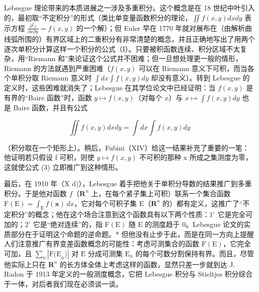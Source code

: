 Lebesgue 理论带来的本质进展之一涉及多重积分。这个概念是在 18 世纪中叶引入的，最初取“不定积分”的形式（类比单变量函数积分的理论，\(\iint f(x,y) dx dy\) 表示方程 \(\frac{\partial^2 z}{\partial x \partial y} = f(x,y)\) 的一个解）；但 Euler 早在 1770 年就对展布在（由解析曲线弧所围的）有界区域上的二重积分有非常清楚的概念，并且正确地写出了用两个逐次单积分计算这样一个积分的公式（I）。只要被积函数连续、积分区域不太复杂，用“Riemann 和”来论证这个公式并不困难；但一旦想处理更一般的情形，Riemann 的方法就遇到严重困难（\(f(x,y)\) 可以在 Riemann 意义下可积，而当各个单积分取 Riemann 意义时 \(\int dx \int f(x,y) dy\) 却没有意义）。转到 Lebesgue 的定义时，这些困难就消失了；Lebesgue 在其学位论文中已经证明：当 \(f(x,y)\) 是有界的“Baire 函数”时，函数 \(y \mapsto f(x,y)\)（对每个 \(x\)）与 \(x \mapsto \int f(x,y) dy\) 也是 Baire 函数，并且有公式

\[
\iint f (x, y) d x d y = \int d x \int f (x, y) d y\tag{3}
\]

（积分取在一个矩形上）。稍后，Fubini（XIV）给这一结果补充了重要的一笔：他证明若只假设 f 可积，则使 \(y \mapsto f(x, y)\) 不可积的那种 x 所成之集测度为零，这就使公式 (3) 立即推广到这种情形。

最后，在 1910 年（X d)），Lebesgue 着手把他关于单积分导数的结果推广到多重积分。于是他对函数 \(f\)（\(\mathbf{R}^n\) 上，在每个紧子集上可积）联系一个集合函数 \(\mathrm{F(E)} = \int_{\mathrm{E}} f(\mathbf{x}) \, dx\)，它对每个可积子集 \(\mathrm{E}\)（\(\mathbf{R}^n\) 的）都有定义，这推广了“不定积分”的概念；他在这个场合注意到这个函数具有以下两个性质：\(1^\circ\) 它是完全可加的；\(2^\circ\) 它是“绝对连续”的，指 \(\mathrm{F(E)}\) 随 \(\mathrm{E}\) 的测度趋于 0。Lebesgue 论文的实质部分在于证明这个命题的逆命题。* 但他没有止步于此，而是在同一方向上提醒人们注意推广有界变差函数概念的可能性：考虑可测集合的函数 \(\mathrm{F(E)}\)，它完全可加，且 \(\sum_{n} |\mathrm{F(E}_{n})|\) 对 \(\mathrm{E}\) 分成可测集 \(\mathrm{E}_{n}\) 的每个可数分割保持有界。而且，尽管他实际上只在 \(\mathbf{R}^n\) 的长方体全体上考虑这样的函数，显然只差一步就到达 J. Radon 于 1913 年定义的一般测度概念，它把 Lebesgue 积分与 Stieltjes 积分综合于一体，对后者我们现在必须谈一谈。

